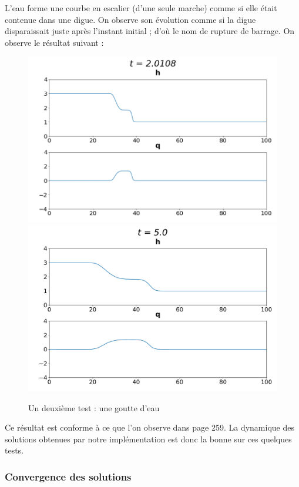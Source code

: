 \documentclass[
11pt, %
francais, %
singlespacing, %
headsepline, %
]{MastersDoctoralThesis} %
\begin{document}
L'eau forme une courbe en escalier (d'une seule marche) comme si elle était contenue dans une digue. On observe son évolution comme si la digue disparaissait juste après l'instant initial ; d'où le nom de
rupture de barrage. On observe le résultat suivant :

\begin{figure}
\includegraphics[scale = .6]{"barrage1"}
\includegraphics[scale = .6]{"barrage5"} 
\caption{Un deuxième test : une goutte d'eau}
\end{figure}

Ce résultat est conforme à ce que l'on observe dans \cite{RL} page 259. La dynamique des solutions obtenues par notre implémentation est donc la bonne sur ces quelques tests.

\subsubsection{Convergence des solutions}
\end{document}

